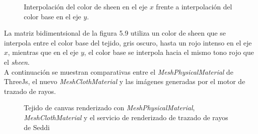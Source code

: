 

\begin{figure}[H]
  \vspace{0.5cm}
  \centering
    \caption{Interpolaci\'on del color de sheen en el eje $x$ frente a interpolaci\'on del color base en el eje $y$.}
\end{figure}

La matriz bidimentsional de la figura 5.9 utiliza un color de sheen que se interpola entre el color base del tejido,
gris oscuro, hasta un rojo intenso en el eje $x$, mientras que en el eje $y$, el color base se interpola hacia el mismo
tono rojo que el \textit{sheen}.\\

\singlespacing
A continuaci\'on se muestran comparativas entre el \textit{MeshPhysicalMaterial} de ThreeJs, el nuevo \textit{MeshClothMaterial}
y las im\'agenes generadas por el motor de trazado de rayos.

\begin{figure}[H]
  \vspace{0.5cm}
  \centering
    \caption{Tejido de canvas renderizado con \textit{MeshPhysicalMaterial}, \textit{MeshClothMaterial} y el servicio de renderizado de trazado de rayos de Seddi}
\end{figure}

